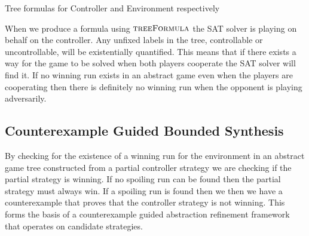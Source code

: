 \documentclass{llncs}
\begin{document}
\begin{algorithm}
    \caption{Tree formulas for Controller and Environment respectively}
    \label{alg:treeFormula}
    \begin{algorithmic}
        \State {}
        \Else
        \State {}
        \EndIf
        \EndFunction
    \end{algorithmic}

    \begin{algorithmic}
        \State {}
        \Else
        \State {}
        \EndIf
        \EndFunction
    \end{algorithmic}
\end{algorithm}

When we produce a formula using $\textsc{treeFormula}$ the SAT solver is
playing on behalf on the controller. Any unfixed labels in the tree,
controllable or uncontrollable, will be existentially quantified.  This means
that if there exists a way for the game to be solved when both players
cooperate the SAT solver will find it. If no winning run exists in an abstract
game even when the players are cooperating then there is definitely no winning
run when the opponent is playing adversarily.

\subsection{Counterexample Guided Bounded Synthesis}

By checking for the existence of a winning run for the environment in an
abstract game tree constructed from a partial controller strategy we are
checking if the partial strategy is winning. If no spoiling run can be found
then the partial strategy must always win. If a spoiling run is found then we
then we have a counterexample that proves that the controller strategy is not
winning. This forms the basis of a counterexample guided abstraction refinement
framework that operates on candidate strategies.
\end{document}
